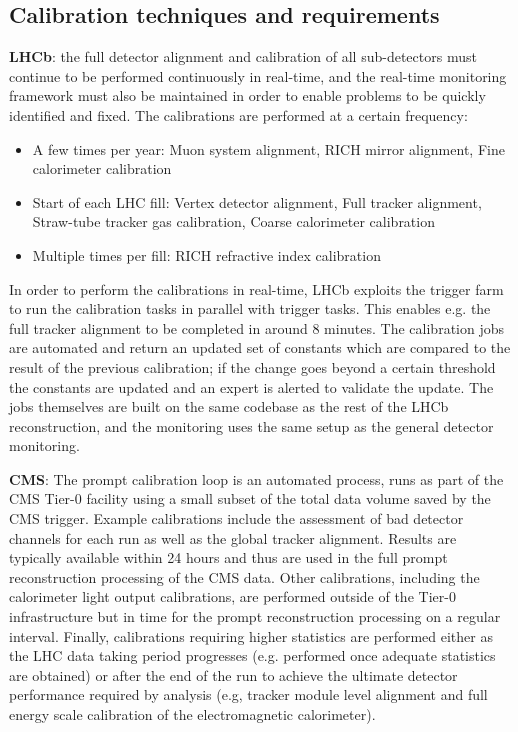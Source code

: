 \subsection{Calibration techniques and requirements}
{\bf LHCb}: the full detector alignment and calibration of all sub-detectors must continue to be performed continuously in real-time, and the real-time monitoring framework must also be maintained 
in order to enable problems to be quickly identified and fixed. The calibrations are performed \cite{LHCbRTCalib2016} at a certain frequency:
\begin{itemize}
\item
A few times per year: Muon system alignment, RICH mirror alignment, Fine calorimeter calibration 
\item
Start of each LHC fill: Vertex detector alignment, Full tracker alignment, Straw-tube tracker gas calibration, Coarse calorimeter calibration
\item
Multiple times per fill: RICH refractive index calibration
\end{itemize}
In order to perform the calibrations in real-time, LHCb exploits the trigger farm to run the calibration tasks in parallel with trigger tasks. This enables e.g. the full tracker alignment to be 
completed in around 8 minutes. The calibration jobs are automated and return an updated set of constants which are compared to the result of the previous calibration; if the change goes beyond a 
certain threshold the constants are updated and an expert is alerted to validate the update. The jobs themselves are built on the same codebase as the rest of the LHCb reconstruction, and the 
monitoring uses the same setup as the general detector monitoring.

\vskip 0.5cm
\noindent
{\bf CMS}: The prompt calibration loop is an automated process, runs as part of the CMS Tier-0 facility using a small subset of the total data volume saved by the CMS trigger. Example calibrations 
include the assessment of bad detector channels for each run as well as the global tracker alignment. Results are typically available within 24 hours and thus are used in the full prompt reconstruction 
processing of the CMS data. Other calibrations, including the calorimeter light output calibrations, are performed outside of the Tier-0 infrastructure but in time for the prompt reconstruction 
processing on a regular interval. Finally, calibrations requiring higher statistics are performed either as the LHC data taking period progresses (e.g. performed once adequate statistics are obtained) 
or after the end of the run to achieve the ultimate detector performance required by analysis (e.g, tracker module level alignment and full energy scale calibration of the electromagnetic calorimeter). 

